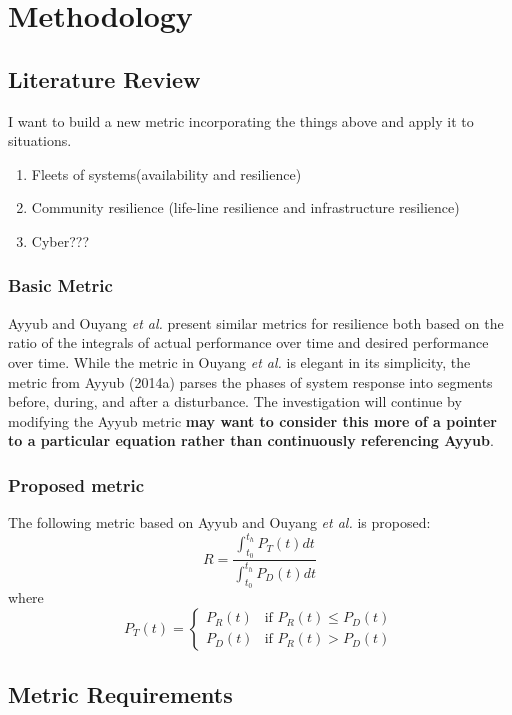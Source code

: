 
\renewcommand{\thechapter}{4}

\chapter{Methodology}

\section{Literature Review}
I want to build a new metric incorporating the things above and apply
it to situations.
\begin{enumerate}
\item Fleets of systems(availability and resilience)
  \item Community resilience (life-line resilience and infrastructure
    resilience)
  \item Cyber???
\end{enumerate}

\subsection{Basic Metric}
Ayyub \cite{Ayyub2014a} and Ouyang \emph{et al.} \cite{Ouyang2012}
present similar metrics for resilience both based on the ratio of the
integrals of actual performance over time and desired performance over
time. While the metric in Ouyang \emph{et al.} is elegant in its
simplicity, the metric from Ayyub (2014a) parses the phases of system
response into segments before, during, and after a disturbance. The
investigation will continue by modifying the Ayyub metric \textbf{may
  want to consider this more of a pointer to a particular equation
  rather than continuously referencing Ayyub}.

\subsection{Proposed metric}
The following metric based on Ayyub \cite{Ayyub2014a, Ayyub2015} and
Ouyang \emph{et al.} \cite{Ouyang2012} is proposed:
$$R = \frac{\int_{t_0}^{t_h}P_T(t)dt}{\int_{t_0}^{t_h}P_D(t)dt}$$
where
\[P_T(t)=
\begin{cases}
  P_R(t) & \text{if } P_R(t) \le P_D(t)\\
  P_D(t) & \text{if } P_R(t) > P_D(t)
\end{cases}\]




\section{Metric Requirements}
